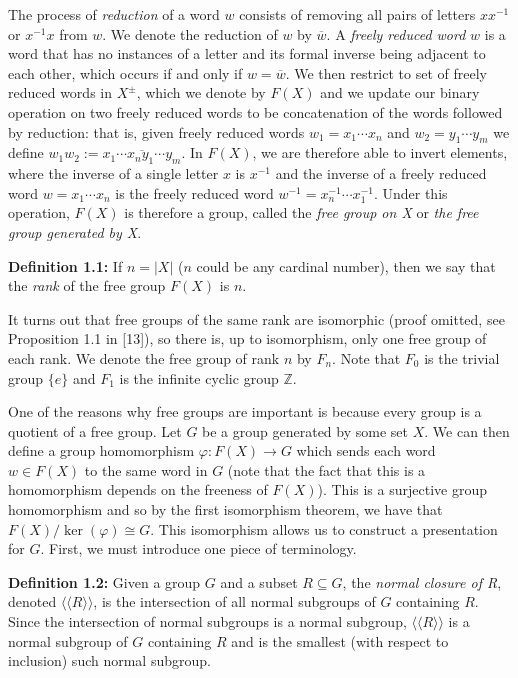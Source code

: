 \documentclass[12pt]{article}
\newcommand{\vs}{\vskip10pt}
\begin{document}
	\vs 
	
	The process of \textit{reduction} of a word $w$ consists of removing all pairs of letters $xx^{-1}$ or $x^{-1}x$ from $w$. We denote the reduction of $w$ by $\overline{w}$. A \textit{freely reduced word} $w$ is a word that has no instances of a letter and its formal inverse being adjacent to each other, which occurs if and only if $w = \overline{w}$. We then restrict to set of freely reduced words in $X^{\pm}$, which we denote by $F(X)$ and we update our binary operation on two freely reduced words to be concatenation of the words followed by reduction: that is, given freely reduced words $w_1 = x_1 \cdots x_n$ and $w_2 = y_1 \cdots y_m$ we define $w_1 w_2 := \overline{x_1 \cdots x_n y_1 \cdots y_m}$. In $F(X)$, we are therefore able to invert elements, where the inverse of a single letter $x$ is $x^{-1}$ and the inverse of a freely reduced word $w = x_1 \cdots x_n$ is the freely reduced word $w^{-1} = x_n^{-1} \cdots x_1^{-1}$. Under this operation, $F(X)$ is therefore a group, called the \textit{free group on X} or \textit{the free group generated by X}. 
	
	\vs 
	
	\textbf{Definition 1.1: } If $n = \vert X \vert$ ($n$ could be any cardinal number), then we say that the \textit{rank} of the free group $F(X)$ is $n$. 
	
	\vs
	
	It turns out that free groups of the same rank are isomorphic (proof omitted, see Proposition 1.1 in [13]), so there is, up to isomorphism, only one free group of each rank. We denote the free group of rank $n$ by $F_n$. Note that $F_0$ is the trivial group $\{e\}$ and $F_1$ is the infinite cyclic group $\mathbb{Z}$.
	
	\vs 
	
	One of the reasons why free groups are important is because every group is a quotient of a free group. Let $G$ be a group generated by some set $X$. We can then define a group homomorphism $\varphi: F(X) \rightarrow G$ which sends each word $w \in F(X)$ to the same word in $G$ (note that the fact that this is a homomorphism depends on the freeness of $F(X)$). This is a surjective group homomorphism and so by the first isomorphism theorem, we have that $F(X) / \ker(\varphi) \cong G$. This isomorphism allows us to construct a presentation for $G$. First, we must introduce one piece of terminology.
	
	\vs 
	
	\textbf{Definition 1.2: } Given a group $G$ and a subset $R \subseteq G$, the \textit{normal closure of R}, denoted $\langle \langle R \rangle \rangle$, is the intersection of all normal subgroups of $G$ containing $R$. Since the intersection of normal subgroups is a normal subgroup, $\langle \langle R \rangle \rangle$ is a normal subgroup of $G$ containing $R$ and is the smallest (with respect to inclusion) such normal subgroup. 
	
\end{document}
